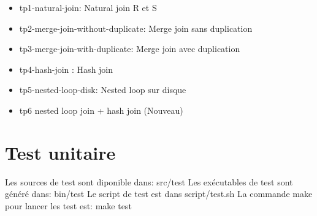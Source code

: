 \documentclass[a4paper]{article}
\begin{document}
\begin{itemize}
  \item tp1-natural-join: Natural join R et S
  \item tp2-merge-join-without-duplicate: Merge join sans duplication
  \item tp3-merge-join-with-duplicate: Merge join avec duplication
  \item tp4-hash-join : Hash join
  \item tp5-nested-loop-disk: Nested loop sur disque
  \item tp6 nested loop join + hash join (Nouveau)
\end{itemize}

\section{Test unitaire}

Les sources de test sont diponible dans: src/test
Les exécutables de test sont généré dans: bin/test
Le script de test est dans script/test.sh
La commande make pour lancer les test est: make test
\end{document}
